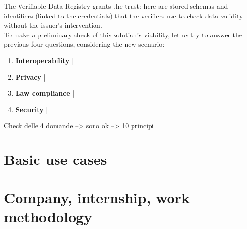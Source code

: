 The Verifiable Data Registry grants the trust: here are stored schemas and 
identifiers (linked to the credentials) that the verifiers use to check 
data validity without the issuer's intervention.
\vspace*{0.3cm}\\
To make a preliminary check of this solution's viability, let us try to 
answer the previous four questions, considering the new scenario:
\begin{enumerate}
    \item \textbf{Interoperability} | 
    \item \textbf{Privacy} | 
    \item \textbf{Law compliance} | 
    \item \textbf{Security} | 
\end{enumerate}
Check delle 4 domande --> sono ok --> 10 principi
\section{Basic use cases}
\section{Company, internship, work methodology}

